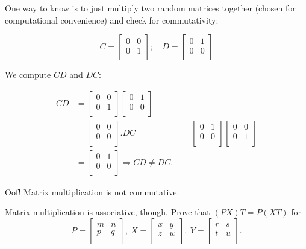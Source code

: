 \documentclass[../gatm_answers.tex]{subfiles}
\begin{document}
One way to know is to just multiply two random matrices together (chosen for computational convenience) and check for commutativity:

$$C = \begin{bmatrix}
0 & 0 \\
0 & 1 \\
\end{bmatrix};\quad D = \begin{bmatrix}
0 & 1 \\
0 & 0 \\
\end{bmatrix}$$

We compute $CD$ and $DC$:

\begin{align*}
CD &= \begin{bmatrix}
0 & 0 \\
0 & 1 \\
\end{bmatrix}\begin{bmatrix}
0 & 1 \\
0 & 0 \\
\end{bmatrix} \\
&= \begin{bmatrix}
0 & 0 \\
0 & 0 \\
\end{bmatrix}.
DC &= \begin{bmatrix}
0 & 1 \\
0 & 0 \\
\end{bmatrix}\begin{bmatrix}
0 & 0 \\
0 & 1 \\
\end{bmatrix} \\
&= \begin{bmatrix}
0 & 1 \\
0 & 0 \\
\end{bmatrix}
\Longrightarrow CD \neq DC.
\end{align*}

Oof! Matrix multiplication is not commutative.

\begin{outer_problem}
\item Matrix multiplication is associative, though. Prove that $(PX)T=P(XT)$ for $$P=\left[\begin{array}{cc} m & n \\ p & q \\ \end{array}\right],\: X=\left[\begin{array}{cc} x & y \\ z & w \\ \end{array}\right],\: Y=\left[\begin{array}{cc} r & s \\ t & u \\ \end{array}\right].$$
\end{outer_problem}
\end{document}
